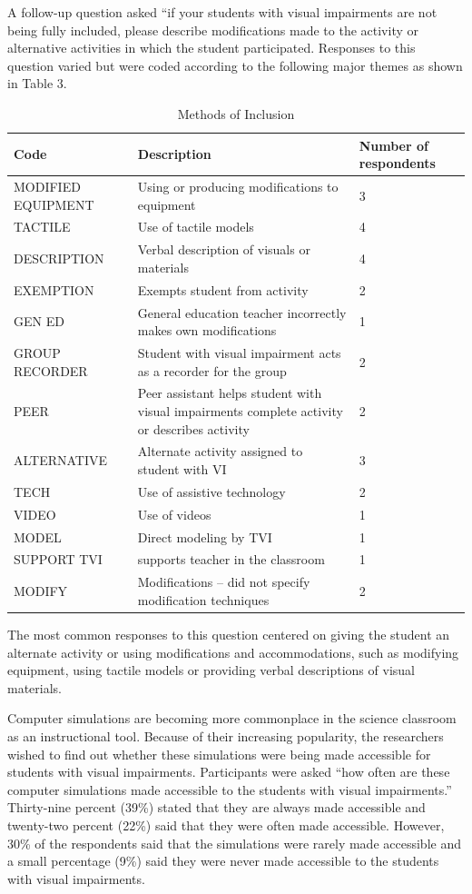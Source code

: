 \documentclass[11.5pt]{sig-alternate} %
\begin{document}
\begin{large}
A follow-up question asked “if your students with visual impairments are not being fully included, please describe modifications made to the activity or alternative activities in which the student participated.  Responses to this question varied but were coded according to the following major themes as shown in Table 3. 

\begin{table}[t]
\caption{Methods of Inclusion}
\begin{tabular}{lll}
\hline
Code & Description & Number of respondents \\ \hline
MODIFIED EQUIPMENT & Using or producing modifications to equipment & 3 \\
TACTILE & Use of tactile models & 4 \\
DESCRIPTION & Verbal description of visuals or materials & 4 \\
EXEMPTION & Exempts student from activity & 2 \\
GEN ED & General education teacher incorrectly makes own modifications & 1 \\
GROUP RECORDER & Student with visual impairment acts as a recorder for the group & 2 \\
PEER & Peer assistant helps student with visual impairments complete activity or describes activity & 2 \\
ALTERNATIVE & Alternate activity assigned to student with VI & 3 \\
TECH & Use of assistive technology & 2 \\
VIDEO & Use of videos & 1 \\
MODEL & Direct modeling by TVI & 1 \\
SUPPORT	TVI & supports teacher in the classroom & 1 \\
MODIFY & Modifications – did not specify modification techniques & 2 \\ \hline
\end{tabular}
\end{table}

The most common responses to this question centered on giving the student an alternate activity or using modifications and accommodations, such as modifying equipment, using tactile models or providing verbal descriptions of visual materials.  

Computer simulations are becoming more commonplace in the science classroom as an instructional tool.  Because of their increasing popularity, the researchers wished to find out whether these simulations were being made accessible for students with visual impairments.  Participants were asked “how often are these computer simulations made accessible to the students with visual impairments.”  Thirty-nine percent (39\%) stated that they are always made accessible and twenty-two percent (22\%) said that they were often made accessible.  However, 30\% of the respondents said that the simulations were rarely made accessible and a small percentage (9\%) said they were never made accessible to the students with visual impairments.


\end{large}
\end{document}
